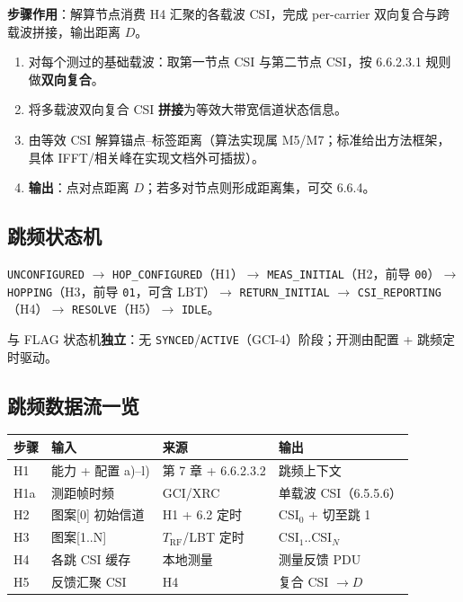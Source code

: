 \documentclass[11pt,a4paper]{ctexart}
\begin{document}
\textbf{步骤作用}：解算节点消费 H4 汇聚的各载波 CSI，完成 per-carrier 双向复合与跨载波拼接，输出距离 $D$。

\begin{enumerate}
  \item 对每个测过的基础载波：取第一节点 CSI 与第二节点 CSI，按 6.6.2.3.1 规则做\textbf{双向复合}。
  \item 将多载波双向复合 CSI \textbf{拼接}为等效大带宽信道状态信息。
  \item 由等效 CSI 解算锚点--标签距离（算法实现属 M5/M7；标准给出方法框架，具体 IFFT/相关峰在实现文档外可插拔）。
  \item \textbf{输出}：点对点距离 $D$；若多对节点则形成距离集，可交 6.6.4。
\end{enumerate}

\subsection{跳频状态机}

\texttt{UNCONFIGURED} $\rightarrow$ \texttt{HOP\_CONFIGURED}（H1）$\rightarrow$ \texttt{MEAS\_INITIAL}（H2，前导 \texttt{00}）$\rightarrow$ \texttt{HOPPING}（H3，前导 \texttt{01}，可含 LBT）$\rightarrow$ \texttt{RETURN\_INITIAL} $\rightarrow$ \texttt{CSI\_REPORTING}（H4）$\rightarrow$ \texttt{RESOLVE}（H5）$\rightarrow$ \texttt{IDLE}。

与 FLAG 状态机\textbf{独立}：无 \texttt{SYNCED}/\texttt{ACTIVE}（GCI-4）阶段；开测由配置 + 跳频定时驱动。

\subsection{跳频数据流一览}

\begin{table}[h]
\centering
\small
\begin{tabular}{llll}
\toprule
\textbf{步骤} & \textbf{输入} & \textbf{来源} & \textbf{输出} \\
\midrule
H1 & 能力 + 配置 a)--l) & 第 7 章 + 6.6.2.3.2 & 跳频上下文 \\
H1a & 测距帧时频 & GCI/XRC & 单载波 CSI（6.5.5.6） \\
H2 & 图案[0] 初始信道 & H1 + 6.2 定时 & CSI$_0$ + 切至跳 1 \\
H3 & 图案[1..N] & $T_{\mathrm{RF}}$/LBT 定时 & CSI$_1$..CSI$_N$ \\
H4 & 各跳 CSI 缓存 & 本地测量 & 测量反馈 PDU \\
H5 & 反馈汇聚 CSI & H4 & 复合 CSI $\rightarrow D$ \\
\bottomrule
\end{tabular}
\end{table}
\end{document}
